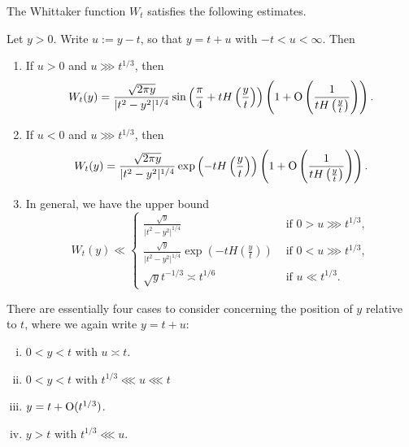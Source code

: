 \documentclass[reqno]{amsart} 
\begin{document}
The Whittaker function $W_t$ satisfies the following estimates.
\begin{lemma}\label{lemma:whittaker-function-estimates}
   Let $y > 0$.  Write $u := y - t$, so that $y = t + u$ with $-t < u < \infty$.  Then
   \begin{enumerate}
   \item If $u > 0$ and $u \ggg t ^{1/3}$, then
    \begin{equation}\label{eqn:bessel-asymptotics-oscillatory}
      W _t (y) =  \frac{\sqrt{2 \pi y}  }{ \lvert t^2 - y^2 \rvert ^{1/4}  }
      \sin \left( \frac{\pi }{4} + t H \left(\frac{y}{t} \right) \right)
      \left( 1 + \operatorname{O} \left( \frac{1}{t H \left(\tfrac{y}{t}\right)} \right) \right).
    \end{equation}
  \item If $u < 0$ and $u \ggg t ^{1/3}$, then
    \begin{equation*}
      W _t (y) =  \frac{\sqrt{2 \pi y}  }{ \lvert t^2 - y^2 \rvert ^{1/4}  }
      \exp \left( - t H \left( \frac{y}{t} \right) \right)
      \left( 1 + \operatorname{O} \left( \frac{1}{t H \left(\tfrac{y}{t}\right)} \right) \right).
    \end{equation*}
  \item In general, we have the upper bound
    \begin{equation*}
      W_t(y) \ll
      \begin{cases}
        \frac{\sqrt{y}}{ \lvert t^2 - y^2 \rvert ^{1/4} }      & \text{ if } 0 > u \ggg t ^{1/3}, \\
        \frac{\sqrt{y}}{ \lvert t^2 - y^2 \rvert ^{1/4} } \exp \left( - t H \left( \frac{y}{t} \right) \right)                                                                & \text{ if } 0 < u \ggg t ^{1/3}, \\
        \sqrt{y} t ^{- 1/3} \asymp t ^{1/6}                                                                & \text{ if } u \ll t ^{1/3}.
      \end{cases}    
    \end{equation*}  
  \end{enumerate}
\end{lemma}
There are essentially four cases to consider concerning the position of $y$ relative to $t$, where we again write $y = t + u$:
\begin{enumerate}[(i)]
\item $0 < y < t$ with $u \asymp t$.
\item $0 < y < t$ with $t ^{1/3} \lll u \lll t$
\item $y = t + \operatorname{O} (t ^{1/3} )$.
\item $y > t$ with $t ^{1/3} \lll u$.
\end{enumerate}
\end{document}
